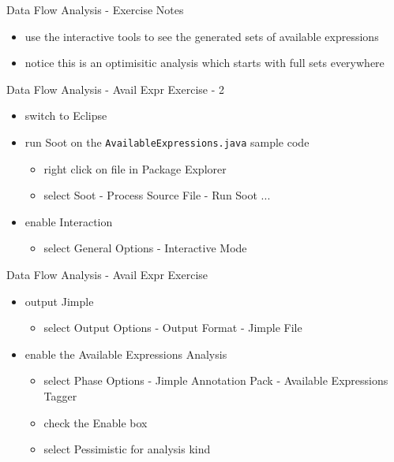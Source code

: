 \documentclass[mcgill,slideColor,colorBG,pdf]{prosper}
\begin{document}
\begin{slide} {Data Flow Analysis - Exercise Notes}
\begin{itemize}
\item use the interactive tools to see the generated sets of available expressions 
\item notice this is an optimisitic analysis which starts with full sets everywhere
\end{itemize}
\end{slide}


\begin{slide} {Data Flow Analysis - Avail Expr Exercise - 2}
\begin{itemize}
\item switch to Eclipse
\item run Soot on the \texttt{AvailableExpressions.java} sample code
\begin{itemize}
\item right click on file in Package Explorer
\item select Soot - Process Source File - Run Soot ...
\end{itemize}
\item enable Interaction 
\begin{itemize}
\item select General Options - Interactive Mode
\end{itemize}
\end{itemize}
\end{slide}

\begin{slide} {Data Flow Analysis - Avail Expr Exercise}
\begin{itemize}
\item output Jimple
\begin{itemize}
\item select Output Options - Output Format - Jimple File
\end{itemize}
\item enable the Available Expressions Analysis
\begin{itemize}
\item select Phase Options - Jimple Annotation Pack - Available Expressions Tagger
\item check the Enable box
\item select Pessimistic for analysis kind
\end{itemize}
\end{itemize}
\end{slide}
\end{document}
